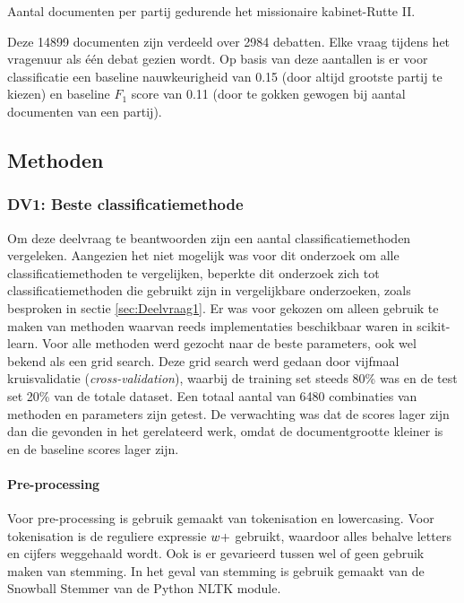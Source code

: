 \begin{table}[H]
\label{aantallen}
\caption{Aantal documenten per partij gedurende het missionaire kabinet-Rutte II.}
\centering

\end{table}
Deze 14899 documenten zijn verdeeld over 2984 debatten. Elke vraag tijdens het vragenuur als één debat gezien wordt. Op basis van deze aantallen is er voor classificatie een baseline nauwkeurigheid van 0.15 (door altijd grootste partij te kiezen) en baseline $F_1$ score van 0.11 (door te gokken gewogen bij aantal documenten van een partij).\par


\subsection{Methoden}


\subsubsection{DV1: Beste classificatiemethode}
Om deze deelvraag te beantwoorden zijn een aantal classificatiemethoden vergeleken. Aangezien het niet mogelijk was voor dit onderzoek om alle classificatiemethoden te vergelijken, beperkte dit onderzoek zich tot classificatiemethoden die gebruikt zijn in vergelijkbare onderzoeken, zoals besproken in sectie \ref{sec:Deelvraag1}. Er was voor gekozen om alleen gebruik te maken van methoden waarvan reeds implementaties beschikbaar waren in scikit-learn. Voor alle methoden werd gezocht naar de beste parameters, ook wel bekend als een grid search. Deze grid search werd gedaan door vijfmaal kruisvalidatie (\textit{cross-validation}), waarbij de training set steeds 80\% was en de test set 20\% van de totale dataset. Een totaal aantal van 6480 combinaties van methoden en parameters zijn getest. De verwachting was dat de scores lager zijn dan die gevonden in het gerelateerd werk, omdat de documentgrootte kleiner is en de baseline scores lager zijn.

\paragraph{Pre-processing}
Voor pre-processing is gebruik gemaakt van tokenisation en lowercasing. Voor tokenisation is de reguliere expressie $\\w+$ gebruikt, waardoor alles behalve letters en cijfers weggehaald wordt. Ook is er gevarieerd tussen wel of geen gebruik maken van stemming. In het geval van stemming is gebruik gemaakt van de Snowball Stemmer van de Python NLTK module.

